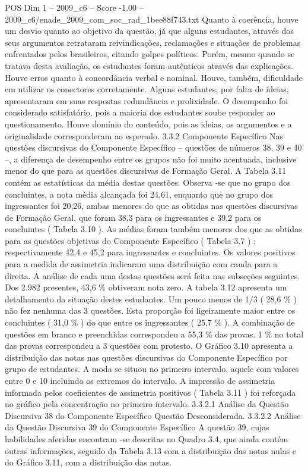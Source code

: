 \begin{textsample}{POS Dim 1 – 2009\_c6 – Score -1.00 – 2009\_c6/enade\_2009\_com\_soc\_rad\_1bee88f743.txt}
Quanto à coerência, houve um desvio quanto ao objetivo da questão, já que alguns estudantes, através dos seus argumentos retrataram reivindicações, reclamações e situações de problemas enfrentados pelos brasileiros, citando golpes políticos.
Porém, mesmo quando se tratava desta avaliação, os estudantes foram autênticos através das explicações.
Houve erros quanto à concordância verbal e nominal.
Houve, também, dificuldade em utilizar os conectores corretamente.
Alguns estudantes, por falta de ideias, apresentaram em suas respostas redundância e prolixidade.
O desempenho foi considerado satisfatório, pois a maioria dos estudantes soube responder ao questionamento.
Houve domínio do conteúdo, pois as ideias, os argumentos e a originalidade corresponderam ao esperado. 3.3.2 Componente Específico Nas questões discursivas do Componente Específico – questões de números 38, 39 e 40 –, a diferença de desempenho entre os grupos não foi muito acentuada, inclusive menor do que para as questões discursivas de Formação Geral.
A Tabela 3.11 contém as estatísticas da média destas questões.
Observa -se que no grupo dos concluintes, a nota média alcançada foi 24,61, enquanto que no grupo dos ingressantes foi 20,26, ambas menores do que as obtidas nas questões discursivas de Formação Geral, que foram 38,3 para os ingressantes e 39,2 para os concluintes ( Tabela 3.10 ).
As médias foram também menores dos que as obtidas para as questões objetivas do Componente Específico ( Tabela 3.7 ) : respectivamente 42,4 e 45,2 para ingressantes e concluintes.
Os valores positivos para a medida de assimetria indicaram uma distribuição com cauda para a direita.
A análise de cada uma destas questões será feita nas subseções seguintes.
Dos 2.982 presentes, 43,6 \% obtiveram nota zero.
A tabela 3.12 apresenta um detalhamento da situação destes estudantes.
Um pouco menos de 1/3 ( 28,6 \% ) não fez nenhuma das 3 questões.
Esta proporção foi ligeiramente maior entre os concluintes ( 31,0 \% ) do que entre os ingressantes ( 25,7 \% ).
A combinação de questões em branco e preenchidas correspondeu a 55,3 \% das provas. 1 \% no total das provas correspondeu a 3 questões com protesto.
O Gráfico 3.10 apresenta a distribuição das notas nas questões discursivas do Componente Específico por grupo de estudantes.
A moda se situou no primeiro intervalo, aquele com valores entre 0 e 10 incluindo os extremos do intervalo.
A impressão de assimetria informada pelos coeficientes de assimetria positivos ( Tabela 3.11 ) foi reforçada no gráfico pela concentração no primeiro intervalo. 3.3.2.1 Análise da Questão Discursiva 38 do Componente Específico Questão Desconsiderada. 3.3.2.2 Análise da Questão Discursiva 39 do Componente Específico A questão 39, cujas habilidades aferidas encontram -se descritas no Quadro 3.4, que ainda contém outras informações, seguido da Tabela 3.13 com a distribuição das notas nulas e do Gráfico 3.11, com a distribuição das notas.

\end{textsample}
